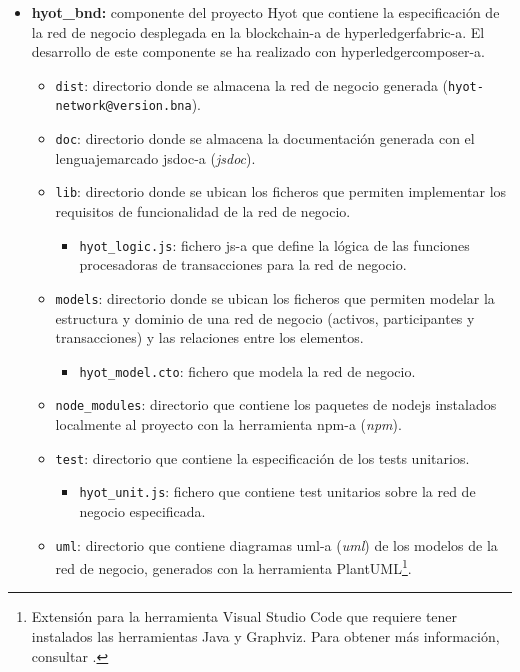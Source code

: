 \documentclass[12pt,a4paper, twoside]{report}
\begin{document}
\begin{itemize}
		\item \textbf{hyot\_bnd:} componente del proyecto Hyot que contiene la especificación de la red de negocio desplegada en la \gls{blockchain-a} de \gls{hyperledgerfabric-a}. El desarrollo de este componente se ha realizado con \gls{hyperledgercomposer-a}.
		\begin{itemize}
			\item \texttt{dist}: directorio donde se almacena la red de negocio generada (\texttt{hyot-network@version.bna}).
			\item \texttt{doc}: directorio donde se almacena la documentación generada con el \gls{lenguajemarcado} \gls{jsdoc-a} (\textit{\gls{jsdoc}}).
			\item \texttt{lib}: directorio donde se ubican los ficheros que permiten implementar los requisitos de funcionalidad de la red de negocio.
			\begin{itemize}
				\item \texttt{hyot\_logic.js}: fichero \gls{js-a} que define la lógica de las funciones procesadoras de transacciones para la red de negocio.
			\end{itemize}
			\item \texttt{models}: directorio donde se ubican los ficheros que permiten modelar la estructura y dominio de una red de negocio (activos, participantes y transacciones) y las relaciones entre los elementos.		
			\begin{itemize}
				\item \texttt{hyot\_model.cto}: fichero que modela la red de negocio.
			\end{itemize}
			\item \texttt{node\_modules}: directorio que contiene los paquetes de \gls{nodejs} instalados localmente al proyecto con la herramienta \gls{npm-a} (\textit{\gls{npm}}).	
			\item \texttt{test}: directorio que contiene la especificación de los tests unitarios.
			\begin{itemize}
				\item \texttt{hyot\_unit.js}: fichero que contiene test unitarios sobre la red de negocio especificada.
			\end{itemize}
			\item \texttt{uml}: directorio que contiene diagramas \gls{uml-a} (\textit{\gls{uml}}) de los modelos de la red de negocio, generados con la herramienta PlantUML\footnote{Extensión para la herramienta Visual Studio Code que requiere tener instalados las herramientas Java y Graphviz. Para obtener más información, consultar \cite{krishnan:uml}.}.

\end{itemize}
\end{itemize}
\end{document}
